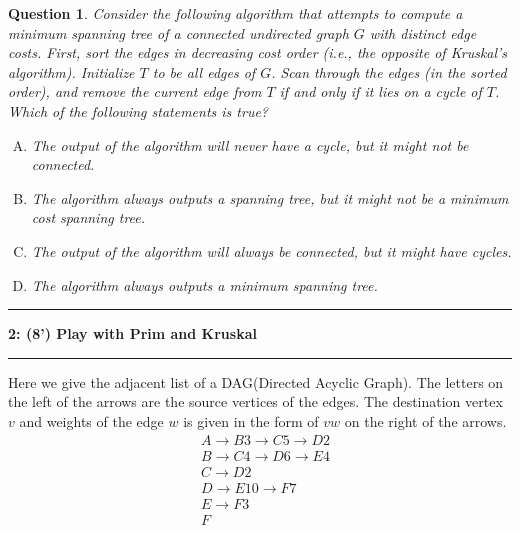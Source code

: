 \documentclass[10.5pt]{article}
\newcommand\question[2]{\vspace{.25in}\hrule\textbf{#1: #2}\vspace{.5em}\hrule\vspace{.10in}}
\newtheorem{Q}{Question}
\begin{document}
\begin{Q}
	Consider the following algorithm that attempts to compute a minimum spanning tree of a connected undirected graph $G$ with distinct edge costs. First, sort the edges in decreasing cost order (i.e., the opposite of Kruskal's algorithm). Initialize $T$ to be all edges of $G$. Scan through the edges (in the sorted order), and remove the current edge from $T$ if and only if it lies on a cycle of $T$.\\
	Which of the following statements is true?
	\begin{enumerate}[(A)]
		\item The output of the algorithm will never have a cycle, but it might not be connected.
		\item The algorithm always outputs a spanning tree, but it might not be a minimum cost spanning tree.
		\item The output of the algorithm will always be connected, but it might have cycles.
		\item The algorithm always outputs a minimum spanning tree.
	\end{enumerate}
\end{Q}
\pagebreak


\question{2}{(8') Play with Prim and Kruskal}
Here we give the adjacent list of a DAG(Directed Acyclic Graph). The letters on the left of the arrows are the source vertices of the edges. The destination vertex $v$ and weights of the edge $w$ is given in the form of ${\boxed{v}\boxed{w}}$ on the right of the arrows.
\begin{align*}
	 & \boxed{A}\rightarrow\boxed{B}\boxed{3}\rightarrow\boxed{C}\boxed{5}\rightarrow\boxed{D}\boxed{2} \\
	 & \boxed{B}\rightarrow\boxed{C}\boxed{4}\rightarrow\boxed{D}\boxed{6}\rightarrow\boxed{E}\boxed{4} \\
	 & \boxed{C}\rightarrow\boxed{D}\boxed{2}                                                           \\
	 & \boxed{D}\rightarrow\boxed{E}\boxed{10}\rightarrow\boxed{F}\boxed{7}                             \\
	 & \boxed{E}\rightarrow\boxed{F}\boxed{3}                                                           \\
	 & \boxed{F}
\end{align*}
\end{document}

